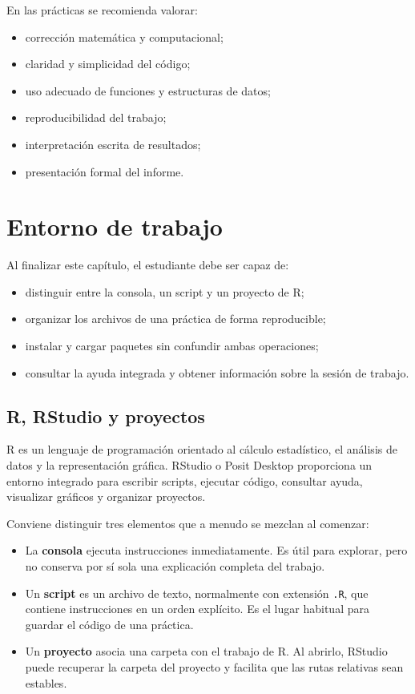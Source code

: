 \documentclass[11pt,a4paper,oneside]{book}
\begin{document}
En las prácticas se recomienda valorar:
\begin{itemize}
  \item corrección matemática y computacional;
  \item claridad y simplicidad del código;
  \item uso adecuado de funciones y estructuras de datos;
  \item reproducibilidad del trabajo;
  \item interpretación escrita de resultados;
  \item presentación formal del informe.
\end{itemize}

\chapter{Entorno de trabajo}

\begin{objetivos}
Al finalizar este capítulo, el estudiante debe ser capaz de:
\begin{itemize}
  \item distinguir entre la consola, un script y un proyecto de R;
  \item organizar los archivos de una práctica de forma reproducible;
  \item instalar y cargar paquetes sin confundir ambas operaciones;
  \item consultar la ayuda integrada y obtener información sobre la sesión de trabajo.
\end{itemize}
\end{objetivos}

\section{R, RStudio y proyectos}
R es un lenguaje de programación orientado al cálculo estadístico, el análisis de datos y la representación gráfica. RStudio o Posit Desktop proporciona un entorno integrado para escribir scripts, ejecutar código, consultar ayuda, visualizar gráficos y organizar proyectos.

Conviene distinguir tres elementos que a menudo se mezclan al comenzar:
\begin{itemize}
  \item La \textbf{consola} ejecuta instrucciones inmediatamente. Es útil para explorar, pero no conserva por sí sola una explicación completa del trabajo.
  \item Un \textbf{script} es un archivo de texto, normalmente con extensión \texttt{.R}, que contiene instrucciones en un orden explícito. Es el lugar habitual para guardar el código de una práctica.
  \item Un \textbf{proyecto} asocia una carpeta con el trabajo de R. Al abrirlo, RStudio puede recuperar la carpeta del proyecto y facilita que las rutas relativas sean estables.
\end{itemize}
\end{document}

